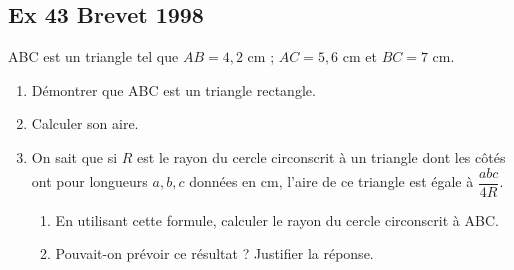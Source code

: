 \documentclass[12pt,a4paper]{article}
\begin{document}
\bigskip

\subsection*{Ex 43 \; Brevet 1998}
ABC est un triangle tel que \(AB=4,2\) cm ; \(AC=5,6\) cm et \(BC=7\) cm.

\begin{enumerate}
  \item Démontrer que ABC est un triangle rectangle.
  \item Calculer son aire.
  \item On sait que si \(R\) est le rayon du cercle circonscrit à un triangle dont les côtés ont pour longueurs \(a, b, c\) données en cm, l’aire de ce triangle est égale à \(\dfrac{abc}{4R}\).
  \begin{enumerate}
    \item En utilisant cette formule, calculer le rayon du cercle circonscrit à ABC.
    \item Pouvait-on prévoir ce résultat ? Justifier la réponse.
  \end{enumerate}
\end{enumerate}
\end{document}
